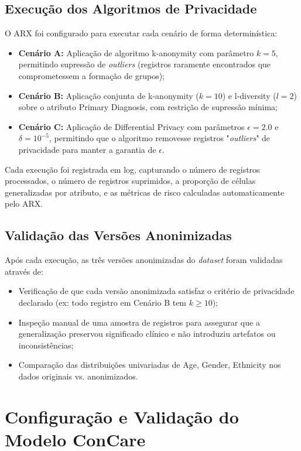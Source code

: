 \subsection{Execução dos Algoritmos de Privacidade}
O ARX foi configurado para executar cada cenário de forma determinística:
\begin{itemize}
    \item \textbf{Cenário A:} Aplicação de algoritmo k-anonymity com parâmetro $k=5$, permitindo supressão de \textit{outliers} (registros raramente encontrados que comprometessem a formação de grupos);
    \item \textbf{Cenário B:} Aplicação conjunta de k-anonymity ($k=10$) e l-diversity ($l=2$) sobre o atributo Primary Diagnosis, com restrição de supressão mínima;
    \item \textbf{Cenário C:} Aplicação de Differential Privacy com parâmetros $\epsilon=2.0$ e $\delta=10^{-5}$, permitindo que o algoritmo removesse registros "\textit{outliers}" de privacidade para manter a garantia de $\epsilon$.
\end{itemize}

Cada execução foi registrada em log, capturando o número de registros processados, o número de registros suprimidos, a proporção de células generalizadas por atributo, e as métricas de risco calculadas automaticamente pelo ARX.

\subsection{Validação das Versões Anonimizadas}
Após cada execução, as três versões anonimizadas do \textit{dataset} foram validadas através de:
\begin{itemize}
    \item Verificação de que cada versão anonimizada satisfaz o critério de privacidade declarado (ex: todo registro em Cenário B tem $k \geq 10$);
    \item Inspeção manual de uma amostra de registros para assegurar que a generalização preservou significado clínico e não introduziu artefatos ou inconsistências;
    \item Comparação das distribuições univariadas de Age, Gender, Ethnicity nos dados originais vs. anonimizados.
\end{itemize}

\section{Configuração e Validação do Modelo ConCare}
\label{sec:dev-concare}

